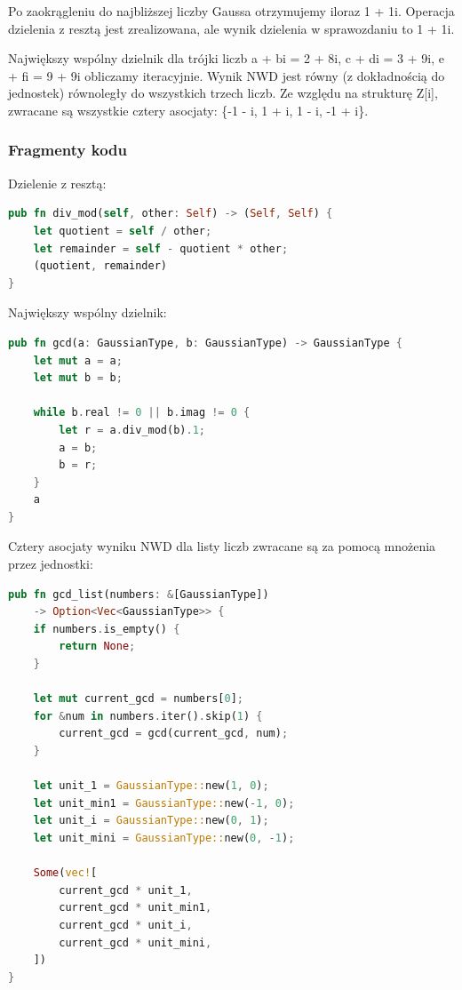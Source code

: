 \documentclass{article}
\begin{document}
Po zaokrągleniu do najbliższej liczby Gaussa otrzymujemy iloraz 1 + 1i. Operacja dzielenia z resztą jest zrealizowana, ale wynik dzielenia w sprawozdaniu to 1 + 1i.

Największy wspólny dzielnik dla trójki liczb a + bi = 2 + 8i, c + di = 3 + 9i, e + fi = 9 + 9i obliczamy iteracyjnie. Wynik NWD jest równy (z dokładnością do jednostek) równoległy do wszystkich trzech liczb. Ze względu na strukturę Z[i], zwracane są wszystkie cztery asocjaty: \{-1 - i, 1 + i, 1 - i, -1 + i\}.

\subsubsection*{Fragmenty kodu}

Dzielenie z resztą:

\begin{lstlisting}[language=Rust]
pub fn div_mod(self, other: Self) -> (Self, Self) {
    let quotient = self / other;
    let remainder = self - quotient * other;
    (quotient, remainder)
}
\end{lstlisting}

Największy wspólny dzielnik:

\begin{lstlisting}[language=Rust]
pub fn gcd(a: GaussianType, b: GaussianType) -> GaussianType {
    let mut a = a;
    let mut b = b;

    while b.real != 0 || b.imag != 0 {
        let r = a.div_mod(b).1;
        a = b;
        b = r;
    }
    a
}
\end{lstlisting}

Cztery asocjaty wyniku NWD dla listy liczb zwracane są za pomocą mnożenia przez jednostki:

\begin{lstlisting}[language=Rust]
pub fn gcd_list(numbers: &[GaussianType]) 
    -> Option<Vec<GaussianType>> {
    if numbers.is_empty() {
        return None;
    }
    
    let mut current_gcd = numbers[0];
    for &num in numbers.iter().skip(1) {
        current_gcd = gcd(current_gcd, num);
    }
    
    let unit_1 = GaussianType::new(1, 0);
    let unit_min1 = GaussianType::new(-1, 0);
    let unit_i = GaussianType::new(0, 1);
    let unit_mini = GaussianType::new(0, -1);

    Some(vec![
        current_gcd * unit_1,
        current_gcd * unit_min1,
        current_gcd * unit_i,
        current_gcd * unit_mini,
    ])
}
\end{lstlisting}
\end{document}

